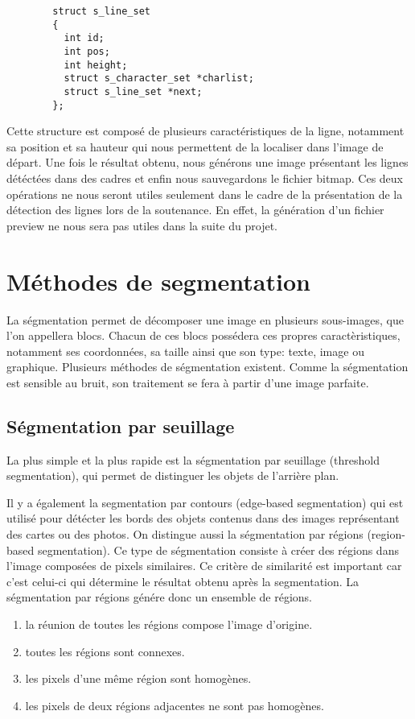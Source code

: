 \documentclass[]{report}
\begin{document}
      \begin{verbatim}
        struct s_line_set
        {
          int id;
          int pos;
          int height;
          struct s_character_set *charlist;
          struct s_line_set *next;
        };
      \end{verbatim}

      Cette structure est composé de plusieurs caractéristiques de la ligne, notamment sa position et sa hauteur qui nous permettent de la localiser dans l'image de départ.
      Une fois le résultat obtenu, nous générons une image présentant les lignes détéctées dans des cadres et enfin nous sauvegardons le fichier bitmap. Ces deux opérations ne nous seront utiles seulement dans le cadre de la présentation de la détection des lignes lors de la soutenance. En effet, la génération d'un fichier preview ne nous sera pas utiles dans la suite du projet.


    \section{M\'ethodes de segmentation} %
    \label{sec:m'ethodes_de_s\'egmentation}
      La ségmentation permet de décomposer une image en plusieurs sous-images, que l'on appellera blocs. Chacun de ces blocs possédera ces propres caractèristiques, notamment ses coordonnées, sa taille ainsi que son type: texte, image ou graphique. Plusieurs méthodes de ségmentation existent. Comme la ségmentation est sensible au bruit, son traitement se fera à partir d'une image parfaite.
      \subsection{Ségmentation par seuillage}
      La plus simple et la plus rapide est la ségmentation par seuillage (threshold segmentation), qui permet de distinguer les objets de l'arrière plan.
      
      
      Il y a également la segmentation par contours (edge-based segmentation) qui est utilisé pour détécter les bords des objets contenus dans des images représentant des cartes ou des photos.
      On distingue aussi la ségmentation par régions (region-based segmentation). Ce type de ségmentation consiste à créer des régions dans l'image composées de pixels similaires. Ce critère de similarité est important car c'est celui-ci qui détermine le résultat obtenu après la segmentation. La ségmentation par régions génére donc un ensemble de régions.
      \begin{enumerate}
        \item la réunion de toutes les régions compose l'image d'origine.
        \item toutes les régions sont connexes.
        \item les pixels d'une même région sont homogènes.
        \item les pixels de deux régions adjacentes ne sont pas homogènes.
      \end{enumerate}
      
\end{document}
